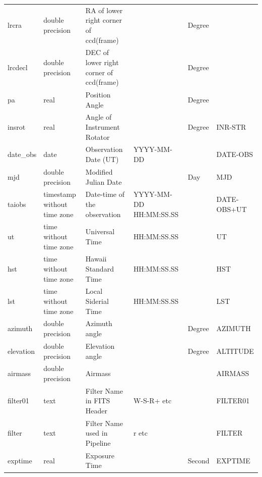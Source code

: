 \documentclass[12pt]{article}
\begin{document}
\begin{table}[thbp]
\begin{center}
{\begin{tabular}{llllll}
lrcra & double precision & RA of lower right corner of ccd(frame)              &                            & Degree      &   \\
lrcdecl & double precision & DEC of lower right corner of ccd(frame)             &                            & Degree      &   \\
pa & real & Position Angle                                      &                            & Degree      &   \\
insrot & real & Angle of Instrument Rotator                         &                            & Degree      & INR-STR  \\
date\_obs & date & Observation Date (UT)                               & YYYY-MM-DD                 &             & DATE-OBS  \\
mjd & double precision & Modified Julian Date                                &                            & Day         & MJD  \\
taiobs & timestamp without time zone & Date-time of the observation                        & YYYY-MM-DD HH:MM:SS.SS     &             & DATE-OBS+UT  \\
ut & time without time zone & Universal Time                                      & HH:MM:SS.SS                &             & UT  \\
hst & time without time zone & Hawaii Standard Time                                & HH:MM:SS.SS                &             & HST  \\
lst & time without time zone & Local Siderial Time                                 & HH:MM:SS.SS                &             & LST  \\
azimuth & double precision & Azimuth angle                                       &                            & Degree      & AZIMUTH  \\
elevation & double precision & Elevation angle                                     &                            & Degree      & ALTITUDE  \\
airmass & double precision & Airmass                                             &                            &             & AIRMASS  \\
filter01 & text & Filter Name in FITS Header                          & W-S-R+  etc                &             & FILTER01  \\
filter & text & Filter Name used in Pipeline                        & r  etc                     &             & FILTER  \\
exptime & real & Exposure Time                                       &                            & Second      & EXPTIME  \\

\end{tabular}}
\end{center}
\end{table}
\end{document}

